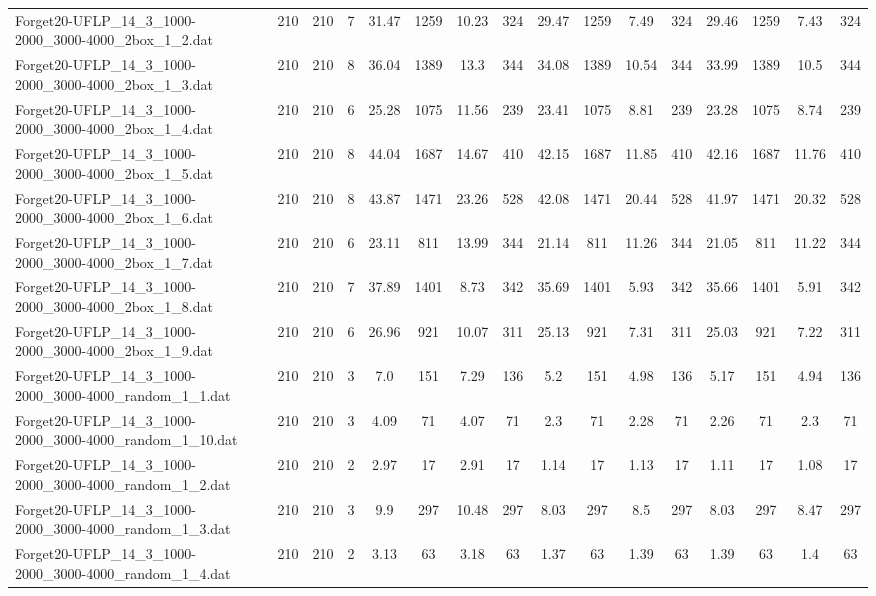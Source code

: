 \begin{sidewaystable}[!ht]
{\begin{tabular}{lccccccccccccccc}
Forget20-UFLP\_14\_3\_1000-2000\_3000-4000\_2box\_1\_2.dat & 210 & 210 & 7 & 31.47 & 1259 & 10.23 & 324 & 29.47 & 1259 & 7.49 & 324 & 29.46 & 1259 & 7.43 & 324 \\
Forget20-UFLP\_14\_3\_1000-2000\_3000-4000\_2box\_1\_3.dat & 210 & 210 & 8 & 36.04 & 1389 & 13.3 & 344 & 34.08 & 1389 & 10.54 & 344 & 33.99 & 1389 & 10.5 & 344 \\
Forget20-UFLP\_14\_3\_1000-2000\_3000-4000\_2box\_1\_4.dat & 210 & 210 & 6 & 25.28 & 1075 & 11.56 & 239 & 23.41 & 1075 & 8.81 & 239 & 23.28 & 1075 & 8.74 & 239 \\
Forget20-UFLP\_14\_3\_1000-2000\_3000-4000\_2box\_1\_5.dat & 210 & 210 & 8 & 44.04 & 1687 & 14.67 & 410 & 42.15 & 1687 & 11.85 & 410 & 42.16 & 1687 & 11.76 & 410 \\
Forget20-UFLP\_14\_3\_1000-2000\_3000-4000\_2box\_1\_6.dat & 210 & 210 & 8 & 43.87 & 1471 & 23.26 & 528 & 42.08 & 1471 & 20.44 & 528 & 41.97 & 1471 &  \textcolor{blue2}{20.32} & 528 \\
Forget20-UFLP\_14\_3\_1000-2000\_3000-4000\_2box\_1\_7.dat & 210 & 210 & 6 & 23.11 & 811 & 13.99 & 344 & 21.14 & 811 & 11.26 & 344 & 21.05 & 811 &  \textcolor{blue2}{11.22} & 344 \\
Forget20-UFLP\_14\_3\_1000-2000\_3000-4000\_2box\_1\_8.dat & 210 & 210 & 7 & 37.89 & 1401 & 8.73 & 342 & 35.69 & 1401 & 5.93 & 342 & 35.66 & 1401 & 5.91 & 342 \\
Forget20-UFLP\_14\_3\_1000-2000\_3000-4000\_2box\_1\_9.dat & 210 & 210 & 6 & 26.96 & 921 & 10.07 & 311 & 25.13 & 921 & 7.31 & 311 & 25.03 & 921 &  \textcolor{blue2}{7.22} & 311 \\
Forget20-UFLP\_14\_3\_1000-2000\_3000-4000\_random\_1\_1.dat & 210 & 210 & 3 & 7.0 & 151 & 7.29 & 136 & 5.2 & 151 & 4.98 & 136 & 5.17 & 151 & 4.94 & 136 \\
Forget20-UFLP\_14\_3\_1000-2000\_3000-4000\_random\_1\_10.dat & 210 & 210 & 3 & 4.09 & 71 & 4.07 & 71 & 2.3 & 71 & 2.28 & 71 & 2.26 & 71 & 2.3 & 71 \\
Forget20-UFLP\_14\_3\_1000-2000\_3000-4000\_random\_1\_2.dat & 210 & 210 & 2 & 2.97 & 17 & 2.91 & 17 & 1.14 & 17 & 1.13 & 17 & 1.11 & 17 &  \textcolor{blue2}{1.08} & 17 \\
Forget20-UFLP\_14\_3\_1000-2000\_3000-4000\_random\_1\_3.dat & 210 & 210 & 3 & 9.9 & 297 & 10.48 & 297 & 8.03 & 297 & 8.5 & 297 & 8.03 & 297 & 8.47 & 297 \\
Forget20-UFLP\_14\_3\_1000-2000\_3000-4000\_random\_1\_4.dat & 210 & 210 & 2 & 3.13 & 63 & 3.18 & 63 & 1.37 & 63 & 1.39 & 63 & 1.39 & 63 & 1.4 & 63 \\

\end{tabular}}
\end{sidewaystable}
